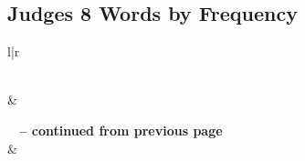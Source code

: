 

\subsection{Judges 8 Words by Frequency}


\normalsize
 
\begin{center}
\begin{longtable}{l|r}
\caption[Judges 8 Words by Frequency]{Judges 8 Words by Frequency}\label{table:WordsbyFrequency for Judges 8} \\
\hline {} &  \\ \hline 
\endfirsthead
 
{{\bfseries \tablename\ \thetable{} -- continued from previous page}} \\  
\hline {} &  \\ \hline 
\endhead
 

\end{longtable}
\end{center}
